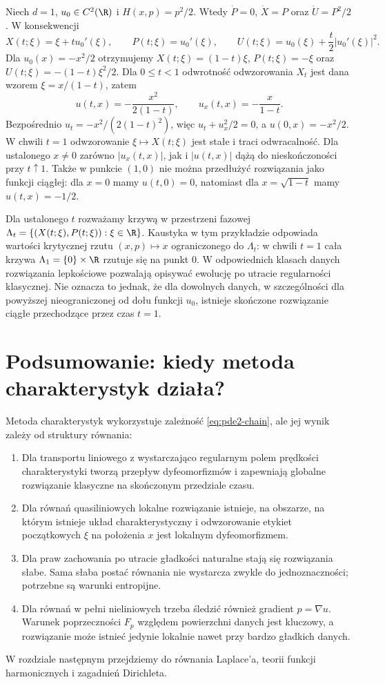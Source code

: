 \begin{przyklad}
\label{ex:pde2-hj-blowup}
Niech $d=1$, $u_0\in C^2(\R)$ i $H(x,p)=p^2/2$. Wtedy
$\dot P=0$, $\dot X=P$ oraz $\dot U=P^2/2$.
W konsekwencji
\[
 X(t;\xi)=\xi+t u_0'(\xi),\qquad
 P(t;\xi)=u_0'(\xi),\qquad
 U(t;\xi)=u_0(\xi)+\frac t2|u_0'(\xi)|^2.
\]
Dla $u_0(x)=-x^2/2$ otrzymujemy
$X(t;\xi)=(1-t)\xi$, $P(t;\xi)=-\xi$ oraz
$U(t;\xi)=-(1-t)\xi^2/2$. Dla $0\leq t<1$
odwrotność odwzorowania $X_t$ jest dana wzorem
$\xi=x/(1-t)$, zatem
\[
 u(t,x)=-\frac{x^2}{2(1-t)},\qquad
 u_x(t,x)=-\frac{x}{1-t}.
\]
Bezpośrednio $u_t=-x^2/(2(1-t)^2)$, więc
$u_t+u_x^2/2=0$, a $u(0,x)=-x^2/2$.
W chwili $t=1$ odwzorowanie $\xi\mapsto X(t;\xi)$
jest stałe i traci odwracalność. Dla ustalonego
$x\ne0$ zarówno $|u_x(t,x)|$, jak i $|u(t,x)|$
dążą do nieskończoności przy $t\uparrow1$.
Także w punkcie $(1,0)$ nie można przedłużyć rozwiązania
jako funkcji ciągłej: dla $x=0$ mamy $u(t,0)=0$,
natomiast dla $x=\sqrt{1-t}$ mamy $u(t,x)=-1/2$.

Dla ustalonego $t$ rozważamy krzywą w przestrzeni fazowej
$\Lambda_t=\{(X(t;\xi),P(t;\xi)):\xi\in\R\}$.
Kaustyka w tym przykładzie odpowiada wartości krytycznej
rzutu $(x,p)\mapsto x$ ograniczonego do $\Lambda_t$:
w chwili $t=1$ cała krzywa $\Lambda_1=\{0\}\times\R$
rzutuje się na punkt $0$.
W odpowiednich klasach danych rozwiązania lepkościowe
pozwalają opisywać ewolucję po utracie regularności
klasycznej. Nie oznacza to jednak, że dla dowolnych
danych, w szczególności dla powyższej nieograniczonej
od dołu funkcji $u_0$, istnieje skończone rozwiązanie
ciągłe przechodzące przez czas $t=1$.
\end{przyklad}

\section{Podsumowanie: kiedy metoda charakterystyk działa?}
\label{sec:pde2-summary}

Metoda charakterystyk wykorzystuje zależność
\eqref{eq:pde2-chain}, ale jej wynik zależy od struktury
równania:
\begin{enumerate}
\item Dla transportu liniowego z wystarczająco regularnym
polem prędkości charakterystyki tworzą przepływ
dyfeomorfizmów i zapewniają globalne rozwiązanie klasyczne
na skończonym przedziale czasu.
\item Dla równań quasiliniowych lokalne rozwiązanie istnieje,
na obszarze, na którym istnieje układ charakterystyczny
i odwzorowanie etykiet początkowych $\xi$ na położenia
$x$ jest lokalnym dyfeomorfizmem.
\item Dla praw zachowania po utracie gładkości naturalne
stają się rozwiązania słabe. Sama słaba postać równania
nie wystarcza zwykle do jednoznaczności; potrzebne są
warunki entropijne.
\item Dla równań w pełni nieliniowych trzeba śledzić
również gradient $p=\nabla u$. Warunek poprzeczności
$F_p$ względem powierzchni danych jest kluczowy,
a rozwiązanie może istnieć jedynie lokalnie nawet
przy bardzo gładkich danych.
\end{enumerate}

W rozdziale następnym przejdziemy do równania Laplace'a,
teorii funkcji harmonicznych i zagadnień Dirichleta.

